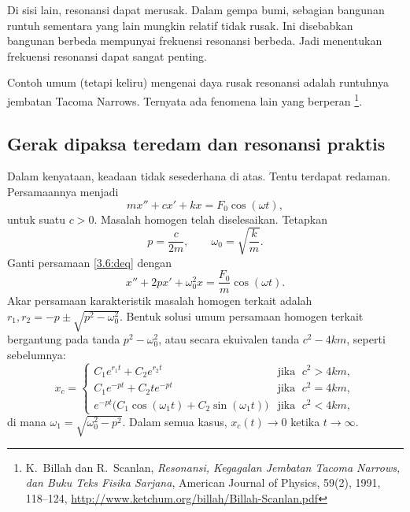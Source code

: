 Di sisi lain, resonansi dapat merusak. Dalam gempa bumi, sebagian bangunan runtuh sementara yang lain mungkin relatif tidak rusak. Ini disebabkan bangunan berbeda mempunyai frekuensi resonansi berbeda. Jadi menentukan frekuensi resonansi dapat sangat penting.

Contoh umum (tetapi keliru) mengenai daya rusak resonansi adalah runtuhnya jembatan Tacoma Narrows. Ternyata ada fenomena lain yang berperan%
\footnote{K.\ Billah dan R.\ Scanlan, \emph{Resonansi, Kegagalan Jembatan Tacoma Narrows, dan Buku Teks Fisika Sarjana}, American Journal of Physics, 59(2), 1991, 118--124,
\url{http://www.ketchum.org/billah/Billah-Scanlan.pdf}}.

\subsection{Gerak dipaksa teredam dan resonansi praktis}

Dalam kenyataan, keadaan tidak sesederhana di atas. Tentu terdapat redaman. Persamaannya menjadi
\begin{equation} \label{3.6:deq}
mx'' + cx' + kx = F_0 \cos (\omega t) ,
\end{equation}
untuk suatu $c > 0$. Masalah homogen telah diselesaikan. Tetapkan
\begin{equation*}
p = \frac{c}{2m},  \qquad \omega_0 = \sqrt{\frac{k}{m}} .
\end{equation*}
Ganti persamaan \eqref{3.6:deq} dengan
\begin{equation*}
x'' + 2px' + \omega_0^2x = \frac{F_0}{m} \cos (\omega t) .
\end{equation*}
Akar persamaan karakteristik masalah homogen terkait adalah $r_1,r_2 = -p \pm \sqrt{p^2 - \omega_0^2}$. Bentuk solusi umum persamaan homogen terkait bergantung pada tanda $p^2 - \omega_0^2$, atau secara ekuivalen tanda $c^2 - 4km$, seperti sebelumnya:
\begin{equation*}
x_c =
\begin{cases}
C_1 e^{r_1 t} + C_2 e^{r_2 t} & \text{jika } \; c^2 > 4km , \\
C_1 e^{-p t} + C_2 t e^{-p t} & \text{jika } \; c^2 = 4km , \\
e^{-p t} \bigl( C_1 \cos (\omega_1 t) + C_2 \sin (\omega_1 t) \bigr) &
  \text{jika } \; c^2 < 4km ,
\end{cases}
\end{equation*}
di mana $\omega_1 = \sqrt{\omega_0^2 - p^2}$. Dalam semua kasus, $x_c(t) \to 0$ ketika $t \to \infty$.

